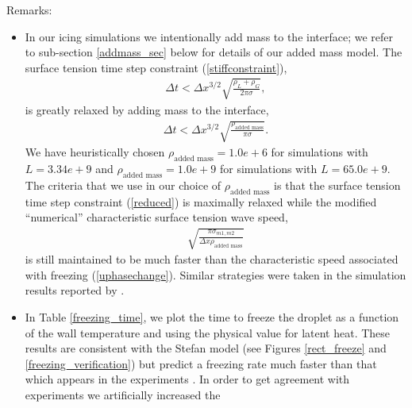 \documentclass[]{article}
\begin{document}
Remarks:
\begin{itemize}
\item In our icing simulations we intentionally add mass to the
interface; we refer to sub-section 
\ref{addmass_sec} 
below for
details of our added mass model.  The surface tension time step
constraint (\ref{stiffconstraint}),
\begin{eqnarray*}
\Delta t< \Delta x^{3/2}
    \sqrt{\frac{\rho_{L}+\rho_{G}}
          {2\pi\sigma}},
\end{eqnarray*}
is greatly relaxed by adding mass to the interface,
\begin{eqnarray}
\Delta t< \Delta x^{3/2}
    \sqrt{\frac{\rho_{\mbox{added mass}}}
          {\pi\sigma}}.
	  \label{reduced}
\end{eqnarray}
We have heuristically chosen
$\rho_{\mbox{added mass}}=1.0e+6$ for simulations with $L=3.34e+9$ and
$\rho_{\mbox{added mass}}=1.0e+9$ for simulations with $L=65.0e+9$.
The criteria that we use in our choice of
$\rho_{\mbox{added mass}}$ is that the 
surface tension time step constraint 
(\ref{reduced}) is maximally relaxed while the
modified ``numerical'' characteristic surface tension wave speed,
\begin{eqnarray*}
\sqrt{\frac{\pi\sigma_{m1,m2}}{\Delta x \rho_{\mbox{added mass}}}}
\end{eqnarray*} 
is still maintained to be
much faster than the characteristic speed associated with 
freezing (\ref{uphasechange}).
Similar strategies were
taken in the simulation results reported by
\cite{shetabivash2020multiple,vu2015numerical,vahab2016adaptive}.
\item In Table \ref{freezing_time}, we plot the time to freeze 
 the droplet as a function of the wall temperature and using
 the physical value for latent heat.  These results are 
 consistent with the Stefan model (see Figures \ref{rect_freeze}
 and \ref{freezing_verification}) but predict a freezing
 rate much faster than that which appears in the 
 experiments \cite{hu2010icing}.  In order to get agreement
 with experiments we artificially increased the

\end{itemize}
\end{document}
